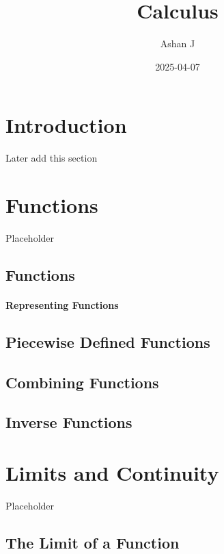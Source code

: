\documentclass[
]{book}
\title{Calculus}
\author{Ashan J}
\date{2025-04-07}
\theoremstyle{definition}
\theoremstyle{definition}
\theoremstyle{definition}
\theoremstyle{definition}
\theoremstyle{remark}
\begin{document}
\maketitle

{
\setcounter{tocdepth}{1}
\tableofcontents
}
\chapter{Introduction}\label{introduction}

Later add this section

\chapter{Functions}\label{functions}

Placeholder

\section{Functions}\label{functions-1}

\subsubsection{Representing Functions}\label{representing-functions}

\section{Piecewise Defined Functions}\label{piecewise-defined-functions}

\section{Combining Functions}\label{combining-functions}

\section{Inverse Functions}\label{inverse-functions}

\chapter{Limits and Continuity}\label{limits-and-continuity}

Placeholder

\section{The Limit of a Function}\label{the-limit-of-a-function}
\end{document}
